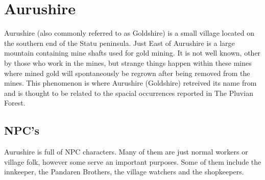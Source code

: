 \section{Aurushire}

Aurushire (also commonly referred to as Goldshire) is a small village located on the southern end of the Statu peninsula. Just East of Aurushire is a large mountain containing mine shafts used for gold mining. It is not well known, other by those who work in the mines, but strange things happen within these mines where mined gold will spontaneously be regrown after being removed from the mines. This phenomenon is where Aurushire (Goldshire) retreived its name from and is thought to be related to the spacial occurrences reported in The Pluvian Forest. 

\subsection{NPC's}

Aurushire is full of NPC characters. Many of them are just normal workers or village folk, however some serve an important purposes. Some of them include the innkeeper, the Pandaren Brothers, the village watchers and the shopkeepers.

